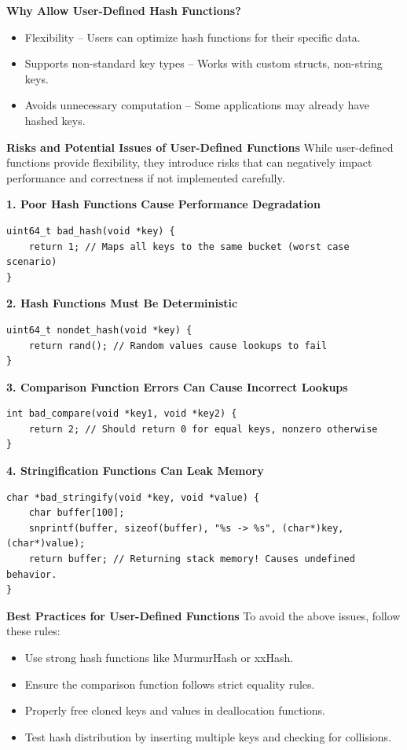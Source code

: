 \documentclass[titlepage]{article}
\begin{document}
\textbf{Why Allow User-Defined Hash Functions?}
\begin{itemize}
    \item Flexibility -- Users can optimize hash functions for their specific data.
    \item Supports non-standard key types -- Works with custom structs, non-string keys.
    \item Avoids unnecessary computation -- Some applications may already have hashed keys.
\end{itemize}

\textbf{Risks and Potential Issues of User-Defined Functions}
While user-defined functions provide flexibility, they introduce risks that can negatively impact performance and correctness if not implemented carefully.

\textbf{1. Poor Hash Functions Cause Performance Degradation}
\begin{verbatim}
uint64_t bad_hash(void *key) {
    return 1; // Maps all keys to the same bucket (worst case scenario)
}
\end{verbatim}

\textbf{2. Hash Functions Must Be Deterministic}
\begin{verbatim}
uint64_t nondet_hash(void *key) {
    return rand(); // Random values cause lookups to fail
}
\end{verbatim}

\textbf{3. Comparison Function Errors Can Cause Incorrect Lookups}
\begin{verbatim}
int bad_compare(void *key1, void *key2) {
    return 2; // Should return 0 for equal keys, nonzero otherwise
}
\end{verbatim}

\textbf{4. Stringification Functions Can Leak Memory}
\begin{verbatim}
char *bad_stringify(void *key, void *value) {
    char buffer[100];
    snprintf(buffer, sizeof(buffer), "%s -> %s", (char*)key, (char*)value);
    return buffer; // Returning stack memory! Causes undefined behavior.
}
\end{verbatim}

\textbf{Best Practices for User-Defined Functions}
To avoid the above issues, follow these rules:
\begin{itemize}
    \item Use strong hash functions like MurmurHash or xxHash.
    \item Ensure the comparison function follows strict equality rules.
    \item Properly free cloned keys and values in deallocation functions.
    \item Test hash distribution by inserting multiple keys and checking for collisions.
\end{itemize}
\end{document}
